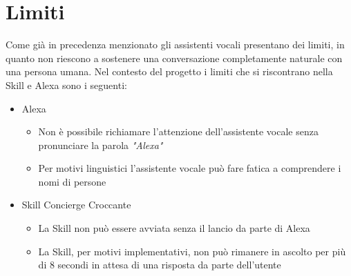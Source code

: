 \section{Limiti}
Come già in precedenza menzionato gli assistenti vocali presentano dei limiti, in quanto non riescono a sostenere una conversazione completamente naturale con una persona umana. Nel contesto del progetto i limiti che si riscontrano nella Skill e Alexa sono i seguenti:
\begin{itemize}
	\item Alexa
	\begin{itemize}
		\item Non è possibile richiamare l'attenzione dell'assistente vocale senza pronunciare la parola \textit{"Alexa"}
		\item Per motivi linguistici l'assistente vocale può fare fatica a comprendere i nomi di persone
	\end{itemize}
	\item Skill Concierge Croccante
	\begin{itemize}
		\item La Skill non può essere avviata senza il lancio da parte di Alexa
		\item La Skill, per motivi implementativi, non può rimanere in ascolto per più di 8 secondi in attesa di una risposta da parte dell'utente
	\end{itemize}
\end{itemize}